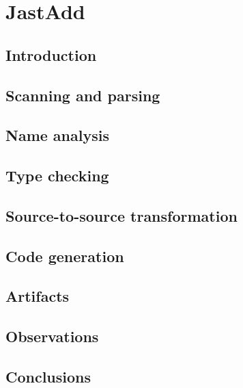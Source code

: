 \section{JastAdd}

\subsection{Introduction}

\subsection{Scanning and parsing}

\subsection{Name analysis}

\subsection{Type checking}

\subsection{Source-to-source transformation}

\subsection{Code generation}

\subsection{Artifacts}

\subsection{Observations}

\subsection{Conclusions}
